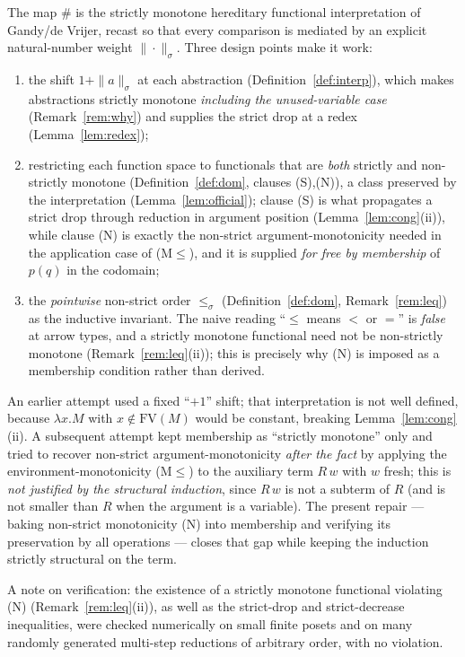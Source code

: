 \documentclass{amsart}
\theoremstyle{definition}
\newcommand{\FV}{\mathrm{FV}}
\begin{document}
The map $\#$ is the strictly monotone hereditary functional interpretation of
Gandy/de Vrijer, recast so that every comparison is mediated by an explicit natural-number
weight $\|\cdot\|_\sigma$. Three design points make it work:
\begin{enumerate}
\item the shift $1+\|a\|_\sigma$ at each abstraction (Definition~\ref{def:interp}), which
  makes abstractions strictly monotone \emph{including the unused-variable case}
  (Remark~\ref{rem:why}) and supplies the strict drop at a redex (Lemma~\ref{lem:redex});
\item restricting each function space to functionals that are \emph{both} strictly and
  non-strictly monotone (Definition~\ref{def:dom}, clauses (S),(N)), a class preserved by the
  interpretation (Lemma~\ref{lem:official}); clause (S) is what propagates a strict drop
  through reduction in argument position (Lemma~\ref{lem:cong}(ii)), while clause (N) is
  exactly the non-strict argument-monotonicity needed in the application case of (M$\le$),
  and it is supplied \emph{for free by membership} of $p(q)$ in the codomain;
\item the \emph{pointwise} non-strict order $\le_\sigma$ (Definition~\ref{def:dom},
  Remark~\ref{rem:leq}) as the inductive invariant. The naive reading ``$\le$ means $<$ or
  $=$'' is \emph{false} at arrow types, and a strictly monotone functional need not be
  non-strictly monotone (Remark~\ref{rem:leq}(ii)); this is precisely why (N) is imposed as a
  membership condition rather than derived.
\end{enumerate}
An earlier attempt used a fixed ``$+1$'' shift; that interpretation is not well defined,
because $\lambda x.M$ with $x\notin\FV(M)$ would be constant, breaking
Lemma~\ref{lem:cong}(ii). A subsequent attempt kept membership as ``strictly monotone'' only
and tried to recover non-strict argument-monotonicity \emph{after the fact} by applying the
environment-monotonicity (M$\le$) to the auxiliary term $R\,w$ with $w$ fresh; this is
\emph{not justified by the structural induction}, since $R\,w$ is not a subterm of $R$ (and
is not smaller than $R$ when the argument is a variable). The present repair --- baking
non-strict monotonicity (N) into membership and verifying its preservation by all operations
--- closes that gap while keeping the induction strictly structural on the term.

A note on verification: the existence of a strictly monotone functional violating (N)
(Remark~\ref{rem:leq}(ii)), as well as the strict-drop and strict-decrease inequalities, were
checked numerically on small finite posets and on many randomly generated multi-step
reductions of arbitrary order, with no violation.
\end{document}
